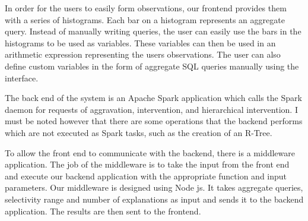 In order for the users to easily form observations, our frontend provides them with a series of histograms. Each bar on a histogram represents an aggregate query. Instead of manually writing queries, the user can easily use the bars in the histograms to be used as variables. These variables can then be used in an arithmetic expression representing the users observations. The user can also define custom variables in the form of aggregate SQL queries manually using the interface.

The back end of the system is an Apache Spark application which calls the Spark daemon for requests of aggravation, intervention, and hierarchical intervention. I must be noted however that there are some operations that the backend performs which are not executed as Spark tasks, such as the creation of an R-Tree.

To allow the front end to communicate with the backend, there is a middleware application. The job of the middleware is to take the input from the front end and execute our backend application with the appropriate function and input parameters. Our middleware is designed using Node js. It takes aggregate queries, selectivity range and number of explanations as input and sends it to the backend application. The results are then sent to the frontend. 